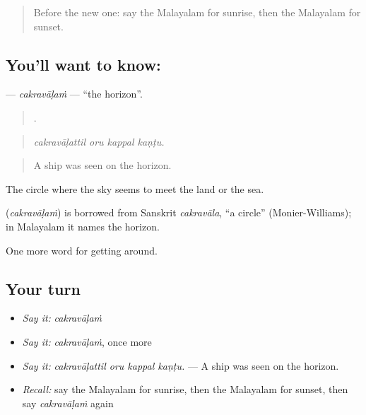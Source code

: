 \label{lesson:ML-C506-cakravalam}



\begin{quote}
Before the new one: say the Malayalam for sunrise, then the Malayalam for sunset.
\end{quote}

\subsection*{You'll want to know: }
\textbf{} — \emph{cakravāḷaṁ} — \textquotedblleft{}the horizon\textquotedblright{}.

\begin{quote}
   .
\end{quote}

\begin{quote}
\emph{cakravāḷattil oru kappal kaṇṭu.}
\end{quote}

\begin{quote}
A ship was seen on the horizon.
\end{quote}

The circle where the sky seems to meet the land or the sea.

\begin{cousinweb}
\textbf{} (\emph{cakravāḷaṁ}) is borrowed from Sanskrit \emph{cakravāla}, \textquotedblleft{}a circle\textquotedblright{} (Monier-Williams); in Malayalam it names the horizon.
\end{cousinweb}

\begin{grammarlens}[title={What you've built}]
One more word for getting around.
\end{grammarlens}

\subsection*{Your turn}
\begin{itemize}
\raggedright
  \item \emph{Say it:} \emph{cakravāḷaṁ}
  \item \emph{Say it:} \emph{cakravāḷaṁ}, once more
  \item \emph{Say it:} \emph{cakravāḷattil oru kappal kaṇṭu.} — A ship was seen on the horizon.
  \item \emph{Recall:} say the Malayalam for sunrise, then the Malayalam for sunset, then say \emph{cakravāḷaṁ} again
\end{itemize}

